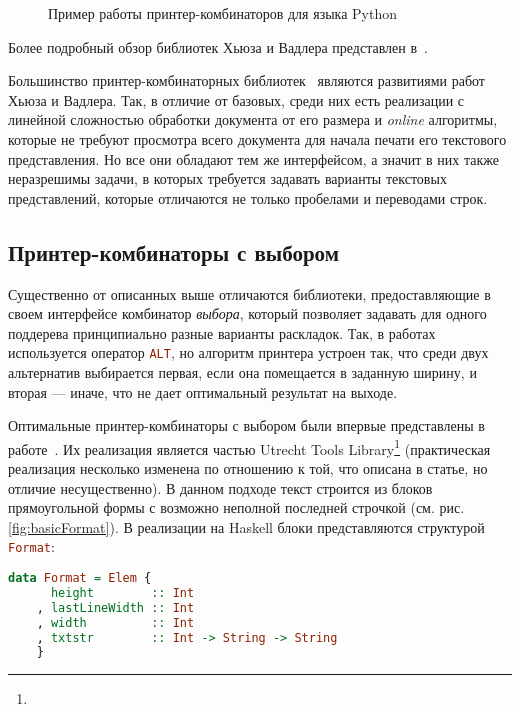 \begin{figure}[h!]
	\centering
	\null\hfill
	\null\hfill
	\hfill\null
	\caption{Пример работы принтер-комбинаторов для языка Python}
  \label{fig:seqEx}	
\end{figure}

Более подробный обзор библиотек Хьюза и Вадлера представлен в~\cite{CoursePaper}.

Большинство принтер-комбинаторных библиотек~\cite{
swierstraChitil, swierstra04, peytonJones, kiselyov, chitil}
являются развитиями работ Хьюза и Вадлера. Так, в отличие от базовых, среди
них есть реализации с линейной сложностью обработки документа от его размера и
\emph{online} алгоритмы, которые не требуют просмотра всего документа
для начала печати его текстового представления. Но все они обладают тем же
интерфейсом, а значит в них также неразрешимы задачи, в которых требуется
задавать варианты текстовых представлений, которые отличаются не только
пробелами и переводами строк.

\subsection{Принтер-комбинаторы с выбором}

Существенно от описанных выше отличаются библиотеки, предоставляющие в своем
интерфейсе комбинатор \emph{выбора}, который позволяет задавать для одного поддерева
принципиально разные варианты раскладок.
Так, в работах~\cite{jongeEveryOccasion, jongeReengine} используется
оператор \lstinline[language = Haskell]{ALT},
но алгоритм принтера устроен так, что среди двух альтернатив выбирается первая, если она
помещается в заданную ширину, и вторая --- иначе,
что не дает оптимальный результат на выходе.

Оптимальные принтер-комбинаторы с выбором были впервые представлены в работе~\cite{swierstra}.
Их реализация является частью Utrecht Tools
Library\footnote{}
(практическая реализация несколько изменена по
отношению к той, что описана в статье, но отличие несущественно).
В данном подходе текст строится из блоков прямоугольной формы с возможно неполной последней
строчкой (см. рис. \ref{fig:basicFormat}). В реализации на Haskell блоки представляются
структурой \lstinline[language = Haskell]{Format}:
\begin{lstlisting}[language=haskell]
    data Format = Elem { 
      height        :: Int
    , lastLineWidth :: Int
    , width         :: Int
    , txtstr        :: Int -> String -> String
    }
\end{lstlisting}

